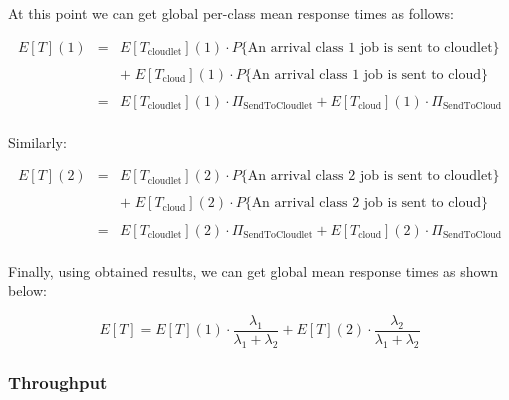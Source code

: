 \documentclass[10pt,a4paper]{article}
\begin{document}
At this point we can get global per-class mean response times as follows:

\begin{equation}
\begin{array} {lcl} 
E[T](1) & = & E[T_{\text{cloudlet}}](1)\cdot P\lbrace\text{An arrival class 1 job is sent to cloudlet}\rbrace \\
\\
& & +\; E[T_{\text{cloud}}](1)\cdot P\lbrace\text{An arrival class 1 job is sent to cloud}\rbrace \\
\\
& = & E[T_{\text{cloudlet}}](1)\cdot \Pi_{\text{SendToCloudlet}} + E[T_{\text{cloud}}](1)\cdot \Pi_{\text{SendToCloud}} \\

\end{array}
\end{equation}

Similarly:

\begin{equation}
\begin{array} {lcl} 
E[T](2) & = & E[T_{\text{cloudlet}}](2)\cdot P\lbrace\text{An arrival class 2 job is sent to cloudlet}\rbrace \\
\\
& & +\; E[T_{\text{cloud}}](2)\cdot P\lbrace\text{An arrival class 2 job is sent to cloud}\rbrace \\
\\
& = & E[T_{\text{cloudlet}}](2)\cdot \Pi_{\text{SendToCloudlet}} + E[T_{\text{cloud}}](2)\cdot \Pi_{\text{SendToCloud}} \\

\end{array}
\end{equation}

Finally, using obtained results, we can get global mean response times as shown below:

\begin{equation}
E[T] = E[T](1) \cdot \dfrac{\lambda_1}{\lambda_1 + \lambda_2} + E[T](2) \cdot \dfrac{\lambda_2}{\lambda_1 + \lambda_2}
\end{equation}

\subsubsection{Throughput}
\end{document}
